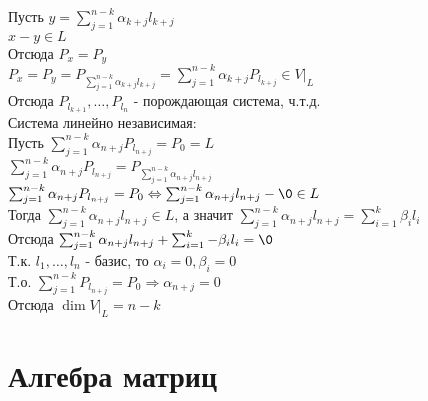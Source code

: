 \documentclass[12pt]{article}
\begin{document}
Пусть $y = \sum_{j=1}^{n-k} \alpha_{k+j}l_{k+j}$\\
$x - y \in L$\\
Отсюда $P_x = P_y$\\
$P_x = P_y = P_{\sum_{j=1}^{n-k} \alpha_{k+j}l_{k+j}} = \sum_{j=1}^{n-k} \alpha_{k+j}P_{l_{k+j}} \in V|_L$\\
Отсюда $P_{l_{k+1}}, \ldots, P_{l_n}$ - порождающая система, ч.т.д.\\
Система линейно независимая:\\
Пусть $\sum_{j=1}^{n-k} \alpha_{n+j} P_{l_{n+j}} = P_0 = L$\\
$\sum_{j=1}^{n-k} \alpha_{n+j} P_{l_{n+j}} = P_{\sum_{j=1}^{n-k} \alpha_{n+j} l_{n+j}}$\\
$\sum_{j=1}^{n-k} \alpha_{n+j} P_{l_{n+j}} = P_0 \Leftrightarrow \sum_{j=1}^{n-k} \alpha_{n+j} l_{n+j} - \0 \in L$\\
Тогда $\sum_{j=1}^{n-k}\alpha_{n+j}  l_{n+j}\in L$, а значит $\sum_{j=1}^{n-k} \alpha_{n+j} l_{n+j} = \sum_{i=1}^k \beta_i l_i$\\
Отсюда $\sum_{j=1}^{n-k} \alpha_{n+j} l_{n+j} + \sum_{i=1}^k -\beta_i l_i = \0$\\
Т.к. $l_1,\ldots, l_n$ - базис, то $\alpha_i = 0, \beta_i = 0$\\
Т.о. $\sum_{j=1}^{n-k} P_{l_{n+j}} = P_0 \Rightarrow \alpha_{n+j} = 0$\\
Отсюда $\dim V|_L = n-k$\\
\section{Алгебра матриц}
\end{document}
